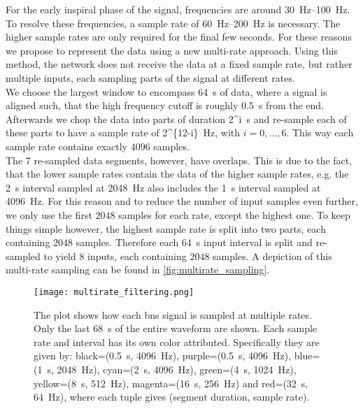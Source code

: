 For the early inspiral phase of the signal, frequencies are around \SIrange{30}{100}{\hertz}. To resolve these frequencies, a sample rate of \SIrange{60}{200}{\hertz} is necessary. The higher sample rates are only required for the final few seconds. For these reasons we propose to represent the data using a new multi-rate approach. Using this method, the network does not receive the data at a fixed sample rate, but rather multiple inputs, each sampling parts of the signal at different rates.\\
We choose the largest window to encompass \SI{64}{\s} of data, where a signal is aligned such, that the high frequency cutoff is roughly \SI{0.5}{\s} from the end. Afterwards we chop the data into parts of duration \SI[parse-numbers=false]{2^i}{\s} and re-sample each of these parts to have a sample rate of \SI[parse-numbers=false]{2^{12-i}}{\hertz}, with $i=0,\dotsc ,6$. This way each sample rate contains exactly $4096$ samples.\\
The 7 re-sampled data segments, however, have overlaps. This is due to the fact, that the lower sample rates contain the data of the higher sample rates, e.g. the \SI{2}{\s} interval sampled at \SI{2048}{\hertz} also includes the \SI{1}{\s} interval sampled at \SI{4096}{\hertz}. For this reason and to reduce the number of input samples even further, we only use the first $2048$ samples for each rate, except the highest one. To keep things simple however, the highest sample rate is split into two parts, each containing $2048$ samples. Therefore each \SI{64}{\s} input interval is split and re-sampled to yield 8 inputs, each containing $2048$ samples. A depiction of this multi-rate sampling can be found in \autoref{fig:multirate_sampling}.
\begin{figure}
\centering
\texttt{[image: multirate\_filtering.png]}
\caption[Multi-rate sampling]{The plot shows how each \gls{bns} signal is sampled at multiple rates. Only the last \SI{68}{\s} of the entire waveform are shown. Each sample rate and interval has its own color attributed. Specifically they are given by: black=(\SI{0.5}{\s}, \SI{4096}{\hertz}), purple=(\SI{0.5}{\s}, \SI{4096}{\hertz}), blue=(\SI{1}{\s}, \SI{2048}{\hertz}), cyan=(\SI{2}{\s}, \SI{4096}{\hertz}), green=(\SI{4}{\s}, \SI{1024}{\hertz}), yellow=(\SI{8}{\s}, \SI{512}{\hertz}), magenta=(\SI{16}{\s}, \SI{256}{\hertz}) and red=(\SI{32}{\s}, \SI{64}{\hertz}), where each tuple gives (segment duration, sample rate).}\label{fig:multirate_sampling}
\end{figure}
\medskip\\
